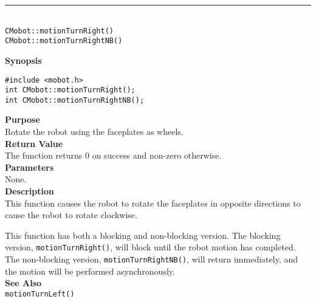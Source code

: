 \noindent
\vspace{5pt}
\rule{4.5in}{0.015in}\\
\noindent
{\LARGE \texttt{CMobot::motionTurnRight()}}\\
{\LARGE \texttt{CMobot::motionTurnRightNB()}}\\
{}

\noindent
{\bf Synopsis}
\vspace{-8pt}
\begin{verbatim}
#include <mobot.h>
int CMobot::motionTurnRight();
int CMobot::motionTurnRightNB();
\end{verbatim}

\noindent
{\bf Purpose}\\
Rotate the robot using the faceplates as wheels.\\

\noindent
{\bf Return Value}\\
The function returns 0 on success and non-zero otherwise.\\

\noindent
{\bf Parameters}\\
None.\\

\noindent
{\bf Description}\\
This function causes the robot to rotate the faceplates in opposite directions
to cause the robot to rotate clockwise.

This function has both a blocking and non-blocking version.
The blocking version, \texttt{motionTurnRight()}, will block until the
robot motion has completed. The non-blocking version, \texttt{motionTurnRightNB()},
will return immediately, and the motion will be performed asynchronously.\\

\noindent
{\bf See Also}\\
\texttt{motionTurnLeft()}

